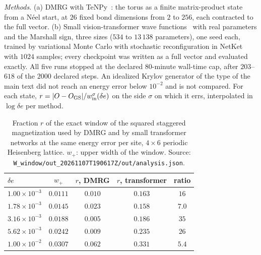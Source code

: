 \documentclass[aps,prx,onecolumn,10pt,nofootinbib,longbibliography,floatfix]{revtex4-2}
\theoremstyle{remark}
\newcommand{\de}{\delta e}
\newcommand{\GS}{\mathrm{GS}}
\begin{document}
\emph{Methods.} (a) DMRG with TeNPy~\cite{hauschild2018,hauschild2024}: the torus as a finite matrix-product state from a N\'eel
start, at $26$ fixed bond dimensions from $2$ to $256$, each contracted to the full vector. (b) Small vision-transformer %
wave functions~\cite{viteritti2023} with real parameters and the Marshall sign, three sizes ($534$ to $13\,138$ %
parameters), one seed each, trained by variational Monte Carlo with stochastic reconfiguration in
NetKet~\cite{vicentini2022} with $1024$ samples; every checkpoint was written as a full vector and evaluated exactly. %
All five runs stopped at the declared $80$-minute wall-time cap, after $203$--$618$ of the $2000$ declared steps. An %
idealized Krylov generator of the type of the main text did not reach an energy error below $10^{-2}$ and is not %
compared. For each state, $r=|O-O_\GS|/w^\sigma_{\rm in}(\de)$ on the side $\sigma$ on which it errs, interpolated in
$\log\de$ per method.

\begin{table}[ht]
\caption{\label{tab:window_24}Fraction $r$ of the exact window of the squared staggered magnetization used by DMRG
and by small transformer networks at the same energy error per site, $4\times6$ periodic Heisenberg lattice. $w_+$:
upper width of the window. Source: \texttt{W\_window/out\_20261107T190617Z/out/analysis.json}.} %
\begin{ruledtabular}
\begin{tabular}{lcccc}
$\de$ & $w_+$ & $r$, DMRG & $r$, transformer & ratio\\
\hline
$1.00\times10^{-3}$ & $0.0111$ & $0.010$ & $0.163$ & $16$\\ %
$1.78\times10^{-3}$ & $0.0145$ & $0.023$ & $0.158$ & $7.0$\\ %
$3.16\times10^{-3}$ & $0.0188$ & $0.005$ & $0.186$ & $35$\\ %
$5.62\times10^{-3}$ & $0.0242$ & $0.009$ & $0.235$ & $26$\\ %
$1.00\times10^{-2}$ & $0.0307$ & $0.062$ & $0.331$ & $5.4$\\ %
\end{tabular}
\end{ruledtabular}
\end{table}
\end{document}
